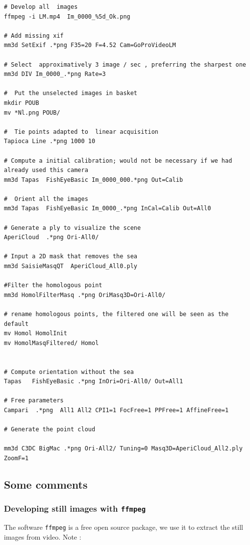 \begin{verbatim}
# Develop all  images
ffmpeg -i LM.mp4  Im_0000_%5d_Ok.png

# Add missing xif
mm3d SetExif .*png F35=20 F=4.52 Cam=GoProVideoLM

# Select  approximatively 3 image / sec , preferring the sharpest one
mm3d DIV Im_0000_.*png Rate=3

#  Put the unselected images in basket
mkdir POUB
mv *Nl.png POUB/

#  Tie points adapted to  linear acquisition
Tapioca Line .*png 1000 10

# Compute a initial calibration; would not be necessary if we had already used this camera
mm3d Tapas  FishEyeBasic Im_0000_000.*png Out=Calib

#  Orient all the images
mm3d Tapas  FishEyeBasic Im_0000_.*png InCal=Calib Out=All0

# Generate a ply to visualize the scene
AperiCloud  .*png Ori-All0/

# Input a 2D mask that removes the sea
mm3d SaisieMasqQT  AperiCloud_All0.ply

#Filter the homologous point
mm3d HomolFilterMasq .*png OriMasq3D=Ori-All0/

# rename homologous points, the filtered one will be seen as the default
mv Homol HomolInit
mv HomolMasqFiltered/ Homol


# Compute orientation without the sea
Tapas   FishEyeBasic .*png InOri=Ori-All0/ Out=All1

# Free parameters
Campari  .*png  All1 All2 CPI1=1 FocFree=1 PPFree=1 AffineFree=1

# Generate the point cloud

mm3d C3DC BigMac .*png Ori-All2/ Tuning=0 Masq3D=AperiCloud_All2.ply ZoomF=1

\end{verbatim}



\subsection{Some comments}\label{GoProVideo:Comments}


\subsubsection{Developing still images with  {\tt ffmpeg}}

The software  {\tt ffmpeg} is a free open source package, we use it to extract the still images from video. Note :

